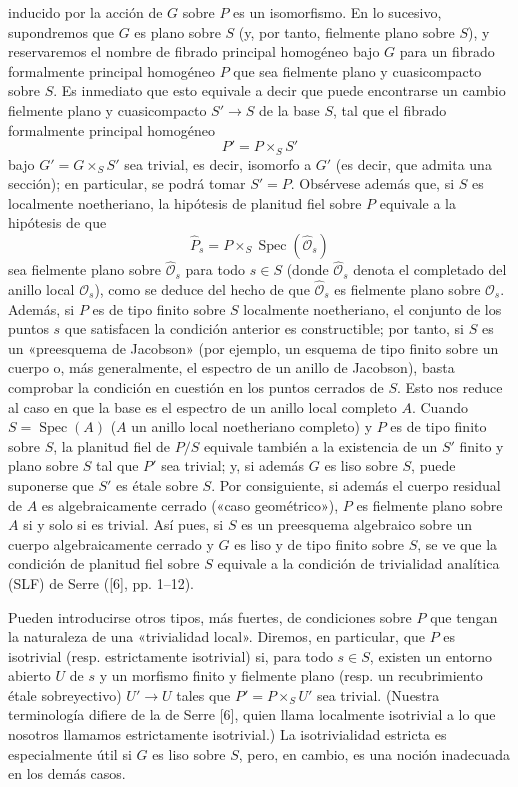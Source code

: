 \documentclass[11pt,twoside,openany]{book}
\numberwithin{equation}{section}
\newcommand{\src}[1]{%
  \phantomsection\hypertarget{src:#1}{}%
  \marginpar{\raggedleft\footnotesize\sffamily #1}%
}
\theoremstyle{plain}
\theoremstyle{definition}
\theoremstyle{remark}
\newcommand{\FgaUnitKey}{frontmatter}
\renewcommand{\src}[1]{%
  \phantomsection\hypertarget{src:\FgaUnitKey:#1}{}%
  \marginpar{\raggedleft\footnotesize\sffamily #1}%
}
\theoremstyle{plain}
\theoremstyle{definition}
\theoremstyle{remark}
\begin{document}
\src{325}
inducido por la acción de $G$ sobre $P$ es un isomorfismo. En lo sucesivo,
supondremos que $G$ es plano sobre $S$ (y, por tanto, fielmente plano sobre
$S$), y reservaremos el nombre de fibrado principal homogéneo bajo $G$ para un
fibrado formalmente principal homogéneo $P$ que sea fielmente plano y
cuasicompacto sobre $S$. Es inmediato que esto equivale a decir que puede
encontrarse un cambio fielmente plano y cuasicompacto
$S'\longrightarrow S$ de la base $S$, tal que el fibrado formalmente principal
homogéneo
\[
  P'=P\times_SS'
\]
bajo $G'=G\times_SS'$ sea trivial, es decir, isomorfo a $G'$ (es decir, que
admita una sección); en particular, se podrá tomar $S'=P$. Obsérvese además
que, si $S$ es localmente noetheriano, la hipótesis de planitud fiel sobre $P$
equivale a la hipótesis de que
\[
  \widehat P_s=P\times_S\operatorname{Spec}(\widehat{\mathcal O}_s)
\]
sea fielmente plano sobre $\widehat{\mathcal O}_s$ para todo $s\in S$ (donde
$\widehat{\mathcal O}_s$ denota el completado del anillo local
$\mathcal O_s$), como se deduce del hecho de que $\widehat{\mathcal O}_s$ es
fielmente plano sobre $\mathcal O_s$. Además, si $P$ es de tipo finito sobre
$S$ localmente noetheriano, el conjunto de los puntos $s$ que satisfacen la
condición anterior es constructible; por tanto, si $S$ es un «preesquema de
Jacobson» (por ejemplo, un esquema de tipo finito sobre un cuerpo o, más
generalmente, el espectro de un anillo de Jacobson), basta comprobar la
condición en cuestión en los puntos cerrados de $S$. Esto nos reduce al caso en
que la base es el espectro de un anillo local completo $A$. Cuando
$S=\operatorname{Spec}(A)$ ($A$ un anillo local noetheriano completo) y $P$ es
de tipo finito sobre $S$, la planitud fiel de $P/S$ equivale también a la
existencia de un $S'$ finito y plano sobre $S$ tal que $P'$ sea trivial; y, si
además $G$ es liso sobre $S$, puede suponerse que $S'$ es étale sobre $S$. Por
consiguiente, si además el cuerpo residual de $A$ es algebraicamente cerrado
(«caso geométrico»), $P$ es fielmente plano sobre $A$ si y solo si es trivial.
Así pues, si $S$ es un preesquema algebraico sobre un cuerpo algebraicamente
cerrado y $G$ es liso y de tipo finito sobre $S$, se ve que la condición de
planitud fiel sobre $S$ equivale a la condición de trivialidad analítica (SLF)
de Serre ([6], pp. 1--12).

Pueden introducirse otros tipos, más fuertes, de condiciones sobre $P$ que
tengan la naturaleza de una «trivialidad local». Diremos, en particular, que
$P$ es isotrivial (resp. estrictamente isotrivial) si, para todo $s\in S$,
existen un entorno abierto $U$ de $s$ y un morfismo finito y fielmente plano
(resp. un recubrimiento étale sobreyectivo) $U'\longrightarrow U$ tales que
$P'=P\times_SU'$ sea trivial. (Nuestra terminología difiere de la de Serre [6],
quien llama localmente isotrivial a lo que nosotros llamamos estrictamente
isotrivial.) La isotrivialidad estricta es especialmente útil si $G$ es liso
sobre $S$, pero, en cambio, es una noción inadecuada en los demás casos.
\end{document}
